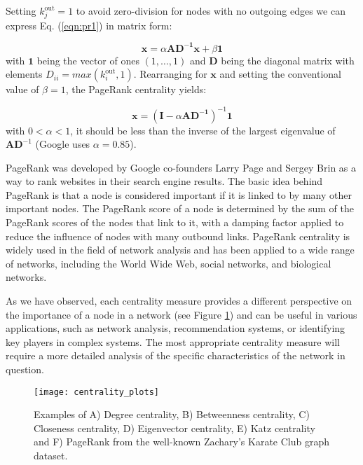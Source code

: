 Setting $k_j^{\text{out}}=1$ to avoid zero-division for nodes with no outgoing edges we can express Eq. (\ref{eqn:pr1}) in matrix form:

\begin{equation}
\label{eqn:pr2}
    \mathbf{x} = \alpha\mathbf{AD^{-1}x} + \beta \mathbf{1}
\end{equation}
with $\mathbf{1}$ being the vector of ones $(1,\dots,1)$ and $\mathbf{D}$ being the diagonal matrix with elements $D_{ii} = max(k_i^{\text{out}},1)$. Rearranging for $\mathbf{x}$ and setting the conventional value of $\beta=1$, the PageRank centrality yields:

\begin{equation}
\label{eqn:pr3}
    \mathbf{x} = (\mathbf{I} - \alpha\mathbf{AD^{-1}})^{-1} \mathbf{1}
\end{equation}
with $0<\alpha<1$, it should be less than the inverse of the largest eigenvalue of $\mathbf{AD}^{-1}$ (Google uses $\alpha = 0.85$).


PageRank was developed by Google co-founders Larry Page and Sergey Brin as a way to rank websites in their search engine results. The basic idea behind PageRank is that a node is considered important if it is linked to by many other important nodes. The PageRank score of a node is determined by the sum of the PageRank scores of the nodes that link to it, with a damping factor applied to reduce the influence of nodes with many outbound links. PageRank centrality is widely used in the field of network analysis and has been applied to a wide range of networks, including the World Wide Web, social networks, and biological networks.

As we have observed, each centrality measure provides a different perspective on the importance of a node in a network (see Figure \ref{centrality}) and can be useful in various applications, such as network analysis, recommendation systems, or identifying key players in complex systems. The most appropriate centrality measure will require a more detailed analysis of the specific characteristics of the network in question.

\begin{figure}[h]\centering
	\texttt{[image: centrality\_plots]}
	\caption{Examples of A) Degree centrality, B) Betweenness centrality, C) Closeness centrality, D) Eigenvector centrality, E) Katz centrality and F) PageRank from the well-known Zachary’s Karate Club graph dataset.}
	\label{centrality}
	\bigskip
\end{figure}

